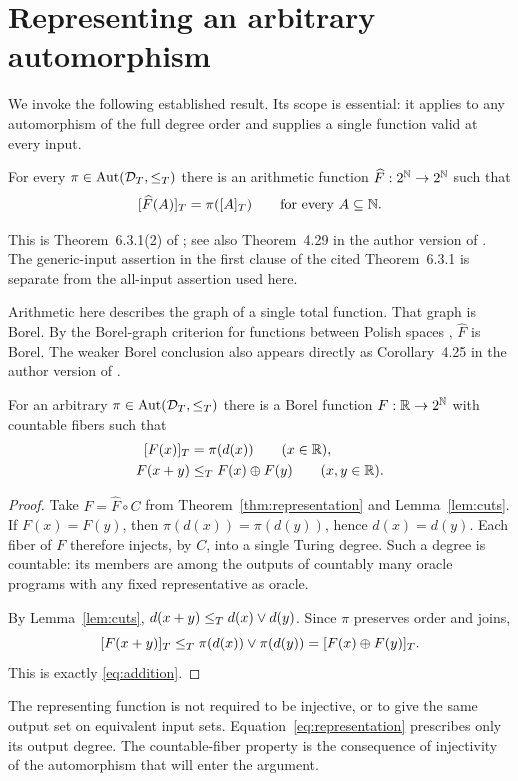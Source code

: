 \section{Representing an arbitrary automorphism}
\label{sec:representation}

We invoke the following established result. Its
scope is essential: it applies to any automorphism of the full
degree order and supplies a single function valid at every input.

\begin{theorem}\label{thm:representation}
For every $\pi\in\operatorname{Aut}(\mathcal D_T,\le_T)$ there is an arithmetic function
$\widehat F:2^\mathbb N\to2^\mathbb N$ such that
\[
[\widehat F(A)]_T=\pi([A]_T)
\qquad\text{for every }A\subseteq\mathbb N.
\]
\end{theorem}

This is Theorem~6.3.1(2) of \cite{SlamanWoodin2005};
see also Theorem~4.29 in the author version of
\cite{SlamanGlobal}. The generic-input assertion in the first
clause of the cited Theorem~6.3.1 is separate from the all-input assertion
used here.

Arithmetic here describes the graph of a single total function.
That graph is Borel. By the Borel-graph
criterion for functions between Polish spaces
\cite[Corollary~4.15]{MarkerDST}, $\widehat F$ is Borel.
The weaker Borel conclusion also appears directly as
Corollary~4.25 in the author version of \cite{SlamanGlobal}.

\begin{lemma}\label{lem:lift}
For an arbitrary $\pi\in\operatorname{Aut}(\mathcal D_T,\le_T)$ there is a Borel
function $F:\mathbb R\to2^\mathbb N$ with countable fibers such that
\begin{align}
[F(x)]_T&=\pi(d(x))\qquad(x\in\mathbb R),\label{eq:representation}\\
F(x+y)&\le_T F(x)\oplus F(y)\qquad(x,y\in\mathbb R).
\label{eq:addition}
\end{align}
\end{lemma}

\begin{proof}
Take $F=\widehat F\circ C$ from
Theorem~\ref{thm:representation} and Lemma~\ref{lem:cuts}.
If $F(x)=F(y)$, then $\pi(d(x))=\pi(d(y))$, hence $d(x)=d(y)$.
Each fiber of $F$ therefore injects, by $C$, into a single
Turing degree. Such a degree is countable: its members are
among the outputs of countably many oracle programs with
any fixed representative as oracle.

By Lemma~\ref{lem:cuts}, $d(x+y)\le_T d(x)\vee d(y)$.
Since $\pi$ preserves order and joins,
\[
[F(x+y)]_T
\le_T \pi(d(x))\vee\pi(d(y))
=[F(x)\oplus F(y)]_T.
\]
This is exactly \eqref{eq:addition}.
\end{proof}

The representing function is not required to be injective,
or to give the same output set on equivalent input sets.
Equation~\eqref{eq:representation} prescribes only its output
degree. The countable-fiber property is the consequence of
injectivity of the automorphism that will enter the argument.
